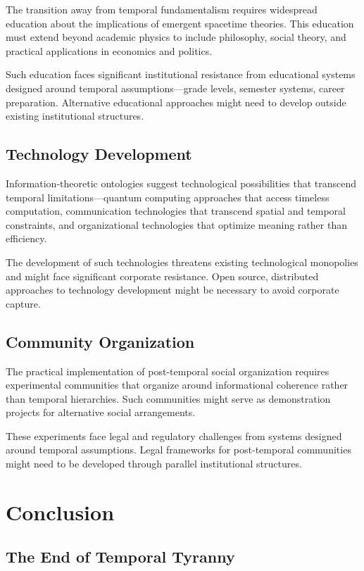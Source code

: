 \documentclass[12pt]{article}
\begin{document}
The transition away from temporal fundamentalism requires widespread education about the implications of emergent spacetime theories. This education must extend beyond academic physics to include philosophy, social theory, and practical applications in economics and politics.

Such education faces significant institutional resistance from educational systems designed around temporal assumptions—grade levels, semester systems, career preparation. Alternative educational approaches might need to develop outside existing institutional structures.

\subsection{Technology Development}

Information-theoretic ontologies suggest technological possibilities that transcend temporal limitations—quantum computing approaches that access timeless computation, communication technologies that transcend spatial and temporal constraints, and organizational technologies that optimize meaning rather than efficiency.

The development of such technologies threatens existing technological monopolies and might face significant corporate resistance. Open source, distributed approaches to technology development might be necessary to avoid corporate capture.

\subsection{Community Organization}

The practical implementation of post-temporal social organization requires experimental communities that organize around informational coherence rather than temporal hierarchies. Such communities might serve as demonstration projects for alternative social arrangements.

These experiments face legal and regulatory challenges from systems designed around temporal assumptions. Legal frameworks for post-temporal communities might need to be developed through parallel institutional structures.

\section{Conclusion}

\subsection{The End of Temporal Tyranny}
\end{document}
